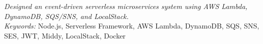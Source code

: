 
\nointent
\textit{Designed an event-driven serverless microservices system using AWS Lambda, DynamoDB, SQS/SNS, and LocalStack.} \\

\nointent
\textit{Keywords:} Node.js, Serverless Framework, AWS Lambda, DynamoDB, SQS, SNS, SES, JWT, Middy, LocalStack, Docker
